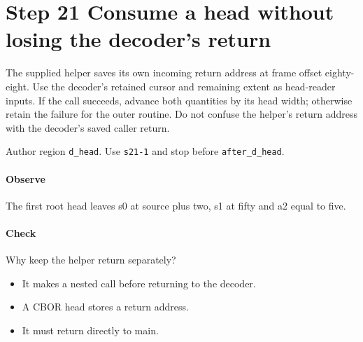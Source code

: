 \section{Step 21 Consume a head without losing the decoder's return}\label{cbor-s21}
The supplied helper saves its own incoming return address at frame offset eighty-eight. Use the decoder's retained cursor and remaining extent as head-reader inputs. If the call succeeds, advance both quantities by its head width; otherwise retain the failure for the outer routine. Do not confuse the helper's return address with the decoder's saved caller return.

Author region \texttt{d\_head}. Use \texttt{s21-1} and stop before \texttt{after\_d\_head}.

\paragraph{Observe} The first root head leaves s0 at source plus two, s1 at fifty and a2 equal to five.

\paragraph{Check} Why keep the helper return separately?
\begin{itemize}
  \item[A.] It makes a nested call before returning to the decoder.
  \item[B.] A CBOR head stores a return address.
  \item[C.] It must return directly to main.
\end{itemize}
